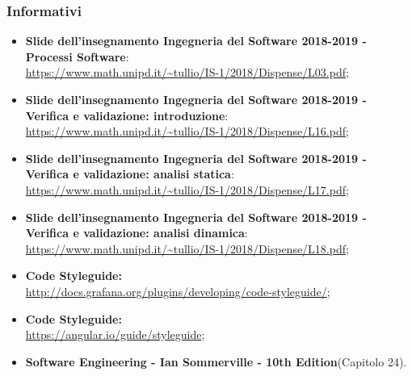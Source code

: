\subsubsection{Informativi}
\begin{itemize}
	\item \textbf{Slide dell'insegnamento Ingegneria del Software 2018-2019 - Processi Software}: \\
	\url{https://www.math.unipd.it/~tullio/IS-1/2018/Dispense/L03.pdf};
	\item \textbf{Slide dell'insegnamento Ingegneria del Software 2018-2019 - Verifica e validazione: introduzione}: \\
	\url{https://www.math.unipd.it/~tullio/IS-1/2018/Dispense/L16.pdf};
	\item \textbf{Slide dell'insegnamento Ingegneria del Software 2018-2019 - Verifica e validazione: analisi statica}: \\
	\url{https://www.math.unipd.it/~tullio/IS-1/2018/Dispense/L17.pdf};
	\item \textbf{Slide dell'insegnamento Ingegneria del Software 2018-2019 - Verifica e validazione: analisi dinamica}: \\
	\url{https://www.math.unipd.it/~tullio/IS-1/2018/Dispense/L18.pdf};
	\item \textbf{ Code Styleguide:} \\
	\url{http://docs.grafana.org/plugins/developing/code-styleguide/};
	\item \textbf{ Code Styleguide:} \\
	\url{https://angular.io/guide/styleguide};	
	\item \textbf{Software Engineering - Ian Sommerville - 10th Edition}(Capitolo 24).
\end{itemize}
\pagebreak
